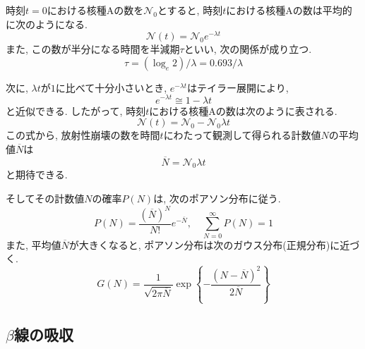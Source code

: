 \documentclass{jarticle}
\begin{document}
時刻$t=0$における核種$\mathrm{A}$の数を$\mathcal{N}_0$とすると, 時刻$t$における核種$\mathrm{A}$の数は平均的に次のようになる.
\begin{equation}
  \mathcal{N}(t) = \mathcal{N}_0 e^{-\lambda t}
\end{equation}
また, この数が半分になる時間を半減期$\tau$といい, 次の関係が成り立つ.
\begin{equation}
  \tau = (\log_e 2)/\lambda
  = 0.693/\lambda
\end{equation}

次に, $\lambda t$が$1$に比べて十分小さいとき, $e^{-\lambda t}$はテイラー展開により,
\begin{equation}
  e^{-\lambda t} \cong 1 - \lambda t
\end{equation}
と近似できる.
したがって, 時刻$t$における核種$\mathrm{A}$の数は次のように表される.
\begin{equation}
  \mathcal{N}(t)=\mathcal{N}_0-\mathcal{N}_0\lambda t
\end{equation}
この式から, 放射性崩壊の数を時間$t$にわたって観測して得られる計数値$N$の平均値$\overline{N}$は
\begin{equation}
  \overline{N} = \mathcal{N}_0\lambda t
\end{equation}
と期待できる.

そしてその計数値$N$の確率$P(N)$は, 次のポアソン分布に従う.
\begin{equation}
  P(N) = \frac{(\overline{N})^N}{N!}e^{-\overline{N}}, \quad
  \sum_{N=0}^{\infty} P(N) = 1
  \label{eq:poisson}
\end{equation}
また, 平均値$\overline{N}$が大きくなると, ポアソン分布は次のガウス分布(正規分布)に近づく.
\begin{equation}
  G(N) = \frac{1}{\sqrt{2\pi\overline{N}}} \exp \left\{-\frac{(N-\overline{N})^2}{2\overline{N}}\right\}
\end{equation}


\subsection{$\beta$線の吸収}
\end{document}

